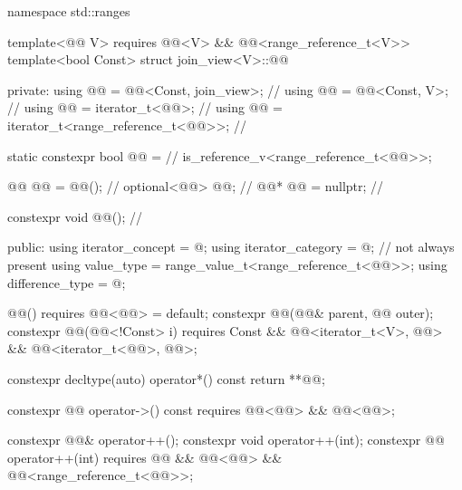 \begin{codeblock}
namespace std::ranges {
  template<@@ V>
    requires @@<V> && @@<range_reference_t<V>>
  template<bool Const>
  struct join_view<V>::@@ {
  private:
    using @@    = @@<Const, join_view>;            // \expos
    using @@      = @@<Const, V>;                    // \expos
    using @@ = iterator_t<@@>;                         // \expos
    using @@ = iterator_t<range_reference_t<@@>>;      // \expos

    static constexpr bool @@ =                      // \expos
      is_reference_v<range_reference_t<@@>>;

    @@ @@ = @@();                             // \expos
    optional<@@> @@;                                 // \expos
    @@* @@  = nullptr;                                 // \expos

    constexpr void @@();                                   // \expos

  public:
    using iterator_concept  = @\seebelow@;
    using iterator_category = @\seebelow@;                        // not always present
    using value_type        = range_value_t<range_reference_t<@@>>;
    using difference_type   = @\seebelow@;

    @@() requires @@<@@> = default;
    constexpr @@(@@& parent, @@ outer);
    constexpr @@(@@<!Const> i)
      requires Const &&
               @@<iterator_t<V>, @@> &&
               @@<iterator_t<@@>, @@>;

    constexpr decltype(auto) operator*() const { return **@@; }

    constexpr @@ operator->() const
      requires @@<@@> && @@<@@>;

    constexpr @@& operator++();
    constexpr void operator++(int);
    constexpr @@ operator++(int)
      requires @@ && @@<@@> &&
               @@<range_reference_t<@@>>;

}}
\end{codeblock}

